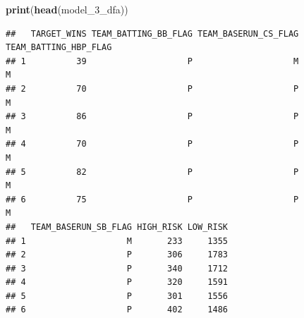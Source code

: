 \documentclass[
]{article}
\newenvironment{Shaded}{\begin{snugshade}}{\end{snugshade}}
\newcommand{\FunctionTok}[1]{\textcolor[rgb]{0.13,0.29,0.53}{\textbf{#1}}}
\newcommand{\NormalTok}[1]{#1}
\begin{document}
\begin{Shaded}
\begin{Highlighting}[]
\FunctionTok{print}\NormalTok{(}\FunctionTok{head}\NormalTok{(model\_3\_dfa))}
\end{Highlighting}
\end{Shaded}

\begin{verbatim}
##   TARGET_WINS TEAM_BATTING_BB_FLAG TEAM_BASERUN_CS_FLAG TEAM_BATTING_HBP_FLAG
## 1          39                    P                    M                     M
## 2          70                    P                    P                     M
## 3          86                    P                    P                     M
## 4          70                    P                    P                     M
## 5          82                    P                    P                     M
## 6          75                    P                    P                     M
##   TEAM_BASERUN_SB_FLAG HIGH_RISK LOW_RISK
## 1                    M       233     1355
## 2                    P       306     1783
## 3                    P       340     1712
## 4                    P       320     1591
## 5                    P       301     1556
## 6                    P       402     1486
\end{verbatim}
\end{document}
